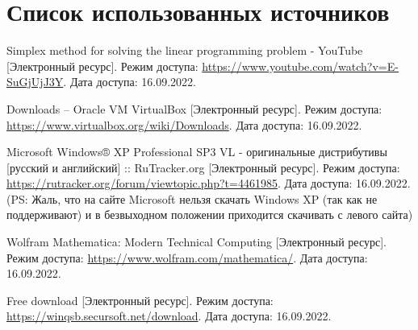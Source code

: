 \newpage

\begingroup
  \section*{Список использованных источников}

  \renewcommand{\addcontentsline}[3]{}%
  \renewcommand{\section}[2]{}%

  \begin{thebibliography}{}
    Simplex method for solving the linear programming problem - YouTube
    [Электронный ресурс].
    Режим доступа: \url{https://www.youtube.com/watch?v=E-SuGjUjJ3Y}.
    Дата доступа: 16.09.2022.

    Downloads – Oracle VM VirtualBox
    [Электронный ресурс].
    Режим доступа: \url{https://www.virtualbox.org/wiki/Downloads}.
    Дата доступа: 16.09.2022.

    Microsoft Windows® XP Professional SP3 VL - оригинальные дистрибутивы [русский и английский] :: RuTracker.org
    [Электронный ресурс].
    Режим доступа: \url{https://rutracker.org/forum/viewtopic.php?t=4461985}.
    Дата доступа: 16.09.2022.
    \\(PS: Жаль, что на сайте Microsoft нельзя скачать Windows XP (так как не поддерживают) и в безвыходном положении приходится скачивать с левого сайта)

    Wolfram Mathematica: Modern Technical Computing
    [Электронный ресурс].
    Режим доступа: \url{https://www.wolfram.com/mathematica/}.
    Дата доступа: 16.09.2022. 

    Free download
    [Электронный ресурс].
    Режим доступа: \url{https://winqsb.secursoft.net/download}.
    Дата доступа: 16.09.2022. 
  \end{thebibliography}
\endgroup

\newpage

\begingroup
  \section*{Литература, чтобы писать в \TeX~(\LaTeX)}
  \addcontentsline{toc}{section}{Литература, чтобы писать в LaTeX}

